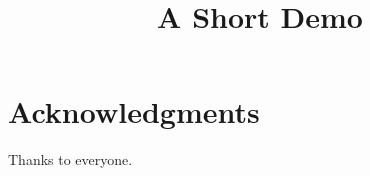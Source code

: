 \documentclass[article]{jss}
\title{A Short Demo}
\begin{document}
\section*{Acknowledgments}
Thanks to everyone.
\end{document}
